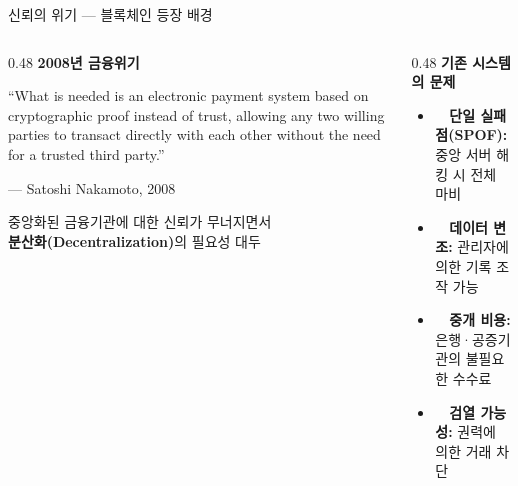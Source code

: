 \documentclass[10pt, aspectratio=169]{beamer}
\begin{document}
\begin{frame}{신뢰의 위기 — 블록체인 등장 배경}
    \vspace{0.3cm}
    \begin{columns}[T]
        \begin{column}{0.48\textwidth}
            \textbf{\color{btcOrange}2008년 금융위기}\\[0.3cm]
            \begin{tcolorbox}[
                colback=btcOrange!8, colframe=btcOrange!60,
                fontupper=\sffamily\normalsize,
                arc=4pt, boxrule=1pt, left=4pt, right=4pt
            ]
            \begin{center}
            {\handwriting
            ``What is needed is an electronic payment system based on cryptographic proof instead of trust, allowing any two willing parties to transact directly with each other without the need for a trusted third party.''
            }\\[0.2cm]
            \end{center}
            {\tiny\color{midSlate} --- Satoshi Nakamoto, 2008}
            \end{tcolorbox}
            \vspace{0.4cm}
            {\small 중앙화된 금융기관에 대한 신뢰가 무너지면서}\\
            {\small \textbf{분산화(Decentralization)}의 필요성 대두}
        \end{column}
        \begin{column}{0.48\textwidth}
            \textbf{\color{chainNavy}기존 시스템의 문제}\\[0.3cm]
            \begin{itemize}\setlength\itemsep{0.5em}
                \item {\small \faExclamationCircle~~\textbf{단일 실패점(SPOF):} 중앙 서버 해킹 시 전체 마비}
                \item {\small \faExclamationCircle~~\textbf{데이터 변조:} 관리자에 의한 기록 조작 가능}
                \item {\small \faExclamationCircle~~\textbf{중개 비용:} 은행·공증기관의 불필요한 수수료}
                \item {\small \faExclamationCircle~~\textbf{검열 가능성:} 권력에 의한 거래 차단}
            \end{itemize}
        \end{column}
    \end{columns}
\end{frame}
\end{document}
